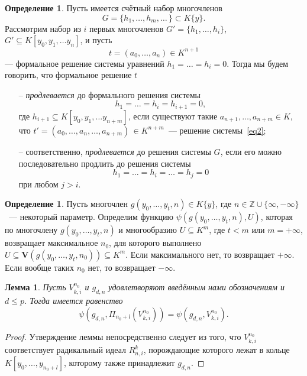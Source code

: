 \documentclass[16pt]{article}
\renewcommand{\le}{\leqslant} %
\theoremstyle{plain1}
\newtheorem{lemma}[theorem1]{Лемма}
\theoremstyle{plain2}
\theoremstyle{plain}
\theoremstyle{plain3}
\theoremstyle{definition}
\newtheorem{definition}[theorem2]{Определение}
\theoremstyle{remark}
\begin{document}
\begin{definition}
Пусть имеется счётный набор многочленов
$$
G=\{h_1,\ldots,h_m,\ldots\,\}\subset K\{y\}.
$$
Рассмотрим набор из $i$ первых многочленов $G'=\{h_1,\ldots,h_i\}$, $G'\subseteq K[y_0,y_1,\ldots
y_n]$, и пусть
$$
t=(a_0,\ldots,a_n)\in K^{n+1}
$$
--- формальное решение системы уравнений $h_1=\ldots=h_i=0$. Тогда мы будем говорить, что формальное решение
$t$ 
\begin{itemize}
\item[--] \emph{продлевается} до формального решения системы
\begin{equation}\label{eq2}
h_1=\ldots=h_i=h_{i+1}=0,
\end{equation}
где $h_{i+1}\subseteq K[y_0,y_1,\ldots y_{n+m}]$,
если существуют такие $a_{n+1},\ldots, a_{n+m}\in K$, что
$t'=(a_0,\ldots,a_n,\ldots,a_{n+m})\,\in K^{n+m}$~--- решение
системы~\eqref{eq2};
\item[--] соответственно, \emph{продлевается} до решения системы $G$, если
его можно последовательно продлить до решения системы 
$$
h_1=\ldots=h_i=\ldots=h_{j}=0$$
при любом $j > i$.
\end{itemize}
\end{definition}



\begin{definition}
Пусть многочлен $g(y_0,\ldots,y_t,n)\in K\{y\}$, где $n\in \mathbb{Z}\cup\{\infty,-\infty\}$~--- некоторый параметр.
Определим функцию $\psi(g(y_0,\ldots,y_t,n),{U})$, которая по многочлену $g(y_0,\ldots,y_t,n)$ и  многообразию ${U}\subseteq K^m$, где $t< m$ или $m=+\infty$, возвращает максимальное $n_0$, для которого выполнено ${U}\subseteq \mathbf{V}(g(y_0,\ldots,y_t,n_0))\subseteq K^m$. Если максимального нет, то возвращает $+\infty$. Если вообще таких  $n_0$ нет, то возвращает $-\infty$.
\end{definition}

\begin{lemma}\label{lemma:o_ravenste_psi}
Пусть ${V}_{k,i}^{n_0}$ и $g_{d,n}$ удовлетворяют введённым нами обозначениям и  $d\le p$. Тогда имеется равенство $$\psi(g_{d,n},\Pi_{n_0+l}({V}_{k,i}^{n_0}))=\psi(g_{d,n},{V}_{k,i}^{n_0}).$$
\end{lemma}

\begin{proof}
Утверждение леммы непосредственно следует из того, что ${V}_{k,i}^{n_0}$ соответствует радикальный идеал $R_{n,i}^k$, порождающие которого лежат в кольце $K[y_0,\ldots,y_{n_0+l}]$, которому также принадлежит $g_{d,n}$.
\end{proof}
\end{document}
